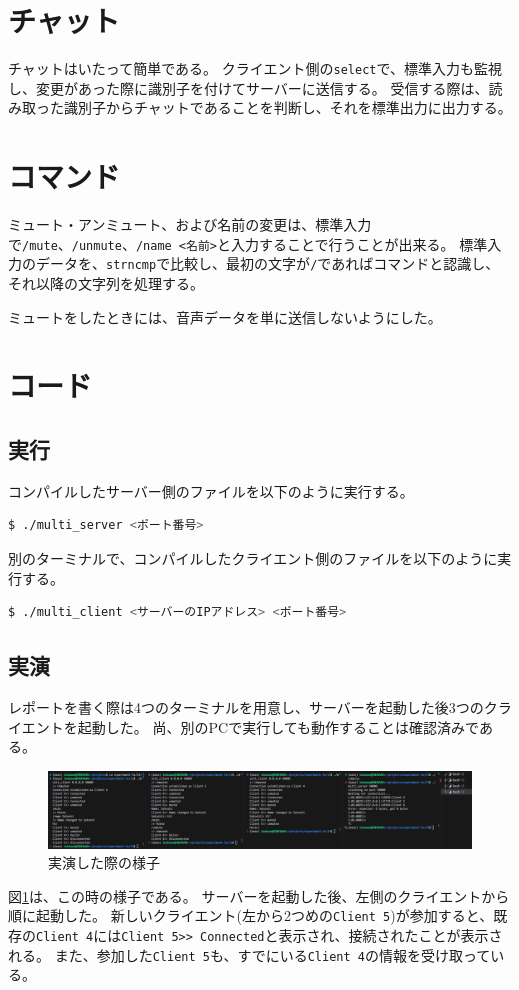 \documentclass[a4paper]{ltjsarticle}
\begin{document}
\section{チャット}
チャットはいたって簡単である。
クライエント側の\verb|select|で、標準入力も監視し、変更があった際に識別子を付けてサーバーに送信する。
受信する際は、読み取った識別子からチャットであることを判断し、それを標準出力に出力する。

\section{コマンド}
ミュート・アンミュート、および名前の変更は、標準入力で\verb|/mute|、\verb|/unmute|、\verb|/name <名前>|と入力することで行うことが出来る。
標準入力のデータを、\verb|strncmp|で比較し、最初の文字が\verb|/|であればコマンドと認識し、それ以降の文字列を処理する。

ミュートをしたときには、音声データを単に送信しないようにした。

\section{コード}
\subsection{実行}
コンパイルしたサーバー側のファイルを以下のように実行する。
\begin{lstlisting}[language=bash]
$ ./multi_server <ポート番号>
\end{lstlisting}
別のターミナルで、コンパイルしたクライエント側のファイルを以下のように実行する。
\begin{lstlisting}[language=bash]
    $ ./multi_client <サーバーのIPアドレス> <ポート番号>
\end{lstlisting}

\subsection{実演}
レポートを書く際は4つのターミナルを用意し、サーバーを起動した後3つのクライエントを起動した。
尚、別のPCで実行しても動作することは確認済みである。
\begin{figure}[htbp]
    \centering
    \includegraphics[width=0.98\columnwidth]{./images/terminal_show.png}
    \caption{実演した際の様子}
    \label{fig:terminal_show}
\end{figure}
図\ref{fig:terminal_show}は、この時の様子である。
サーバーを起動した後、左側のクライエントから順に起動した。
新しいクライエント(左から2つめの\verb|Client 5|)が参加すると、既存の\verb|Client 4|には\verb|Client 5>> Connected|と表示され、接続されたことが表示される。
また、参加した\verb|Client 5|も、すでにいる\verb|Client 4|の情報を受け取っている。
\end{document}
